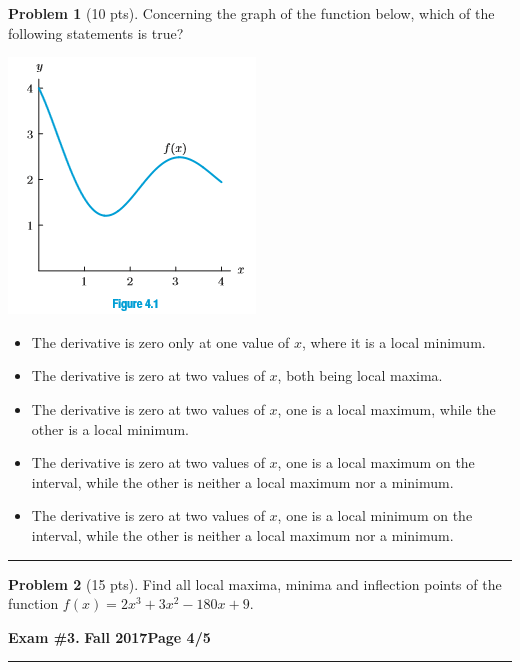 \documentclass[12pt]{article}
\makeatletter
\theoremstyle{definition}
\newtheorem{problem}{Problem}
\newcommand*{\radiobutton}{%
  \@ifstar{\@radiobutton0}{\@radiobutton1}%
}
\newcommand*{\@radiobutton}[1]{%
  \begin{tikzpicture}
    \pgfmathsetlengthmacro\radius{height("X")/2}
    \draw[radius=\radius] circle;
    \ifcase#1 \fill[radius=.6*\radius] circle;\fi
  \end{tikzpicture}%
}
\makeatother
\begin{document}
\bigskip
\begin{problem}[10 pts]
Concerning the graph of the function below, which of the following statements is true?
\begin{center}
\includegraphics{3graph3}
\end{center}
\begin{itemize}
\item[\radiobutton] The derivative is zero only at one value of $x$, where it is a local minimum.
\item[\radiobutton] The derivative is zero at two values of $x$, both being local maxima.
\item[\radiobutton] The derivative is zero at two values of $x$, one is a local maximum, while the other is a local minimum.
\item[\radiobutton] The derivative is zero at two values of $x$, one is a local maximum on the interval, while the other is neither a local maximum nor a minimum.
\item[\radiobutton] The derivative is zero at two values of $x$, one is a local minimum on the interval, while the other is neither a local maximum nor a minimum.
\end{itemize}
\end{problem}

\hrule
\begin{problem}[15 pts]
Find all local maxima, minima and inflection points of the function $f(x) = 2x^3 + 3x^2-180x+9$.
\end{problem}

\newpage

\hfill{\large\bf Exam \#3.}\hfill{\large\bf
  Fall 2017}\hfill{\large\bf Page 4/5}\hrule

\bigskip
\end{document}
